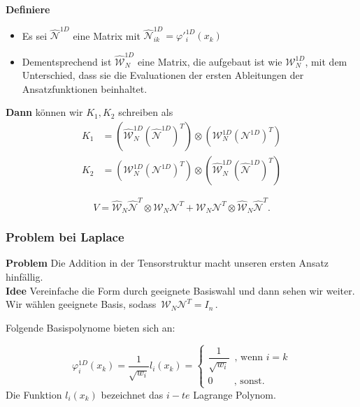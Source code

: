 \begin{frame}
\textbf{Definiere}
\begin{itemize}
\item Es sei $\widehat{\mathcal{N}}^{1D}$ eine Matrix mit $\widehat{\mathcal{N}}^{1D}_{ik}=\varphi'^{1D}_i(x_k)$
\item Dementsprechend ist $\widehat{\mathcal{W}}^{1D}_N$ eine Matrix, die aufgebaut ist wie $\mathcal{W}^{1D}_N$, mit dem Unterschied, dass sie die Evaluationen der ersten Ableitungen der Ansatzfunktionen beinhaltet.
\end{itemize}
\pause
\textbf{Dann} können wir $K_1,K_2$ schreiben als
\begin{align*}
K_1 &= (\widehat{\mathcal{W}}_N^{1D} (\widehat{\mathcal{N}}^{1D})^T) \otimes (\mathcal{W}_N^{1D}(\mathcal{N}^{1D})^T) \\
K_2 &= (\mathcal{W}_N^{1D} (\mathcal{N}^{1D})^T) \otimes (\widehat{\mathcal{W}}_N^{1D} (\widehat{\mathcal{N}}^{1D})^T)
\end{align*}
\begin{framed}
\begin{equation*}
V =\widehat{\mathcal{W}}_N \widehat{\mathcal{N}}^T \otimes \mathcal{W}_N \mathcal{N}^{T} + \mathcal{W}_N \mathcal{N}^{T}\otimes \widehat{\mathcal{W}}_N \widehat{\mathcal{N}}^T.
\end{equation*}
\end{framed}
\end{frame}

\begin{frame}
\frametitle{Problem bei Laplace}
\textbf{Problem } Die Addition in der Tensorstruktur macht unseren ersten Ansatz hinfällig. \\
\textbf{Idee } Vereinfache die Form durch geeignete Basiswahl und dann sehen wir weiter. Wir wählen geeignete Basis, sodass $ \, \mathcal{W}_N \mathcal{N}^{T} = I_n \, $.

Folgende Basispolynome bieten sich an:
\begin{framed}
\begin{equation*}
\varphi^{1D}_i (x_k) = \dfrac{1}{ \sqrt{w_i} } l_i (x_k) = 
\begin{cases}
\dfrac{1}{ \sqrt{w_i} } \, \text{ , wenn } i=k  \\
0  \, \, \, \, \, \, \, \, \, \, \, \text{ , sonst. }
\end{cases}
\end{equation*}
Die Funktion $l_i(x_k)$ bezeichnet das $i-te$ Lagrange Polynom.
\end{framed}
\end{frame}

